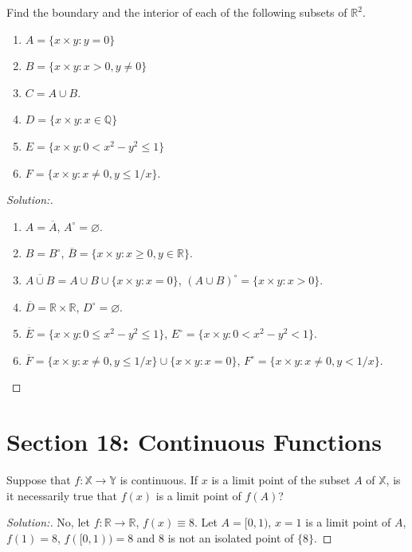 \documentclass[a4paper,12pt, reqno]{article}
\theoremstyle{definition}
\newenvironment{exerr}[1]{
  \renewcommand\theexeralt{#1}
  \exeralt
}{\endexeralt}
\newenvironment{solution}{\begin{proof}[Solution:]}{\end{proof}}
\newcommand{\R}{\mathbb{R}}
\newcommand{\Q}{\mathbb{Q}}
\newcommand{\X}{\mathbb{X}}
\newcommand{\Y}{\mathbb{Y}}
\begin{document}
\begin{exerr}{20}
  Find the boundary and the interior of each of the following subsets of $\R^2$.
  \begin{enumerate}[label = (\alph*)]
    \item $A = \{ x\times y : y=0 \}$
    \item $B = \{ x\times y : x>0, y\neq 0 \}$
    \item $C = A\cup B$.
    \item $D = \{ x\times y : x\in \Q \}$
    \item $E = \{ x\times y : 0<x^2-y^2\leq 1 \}$
    \item $F = \{ x\times y : x\neq0, y\leq 1/x \}$.
  \end{enumerate}
\end{exerr}
\begin{solution}\hfill
  \begin{enumerate}[label = (\alph*)]
    \item $A = \overline{A}$, $A^\circ = \varnothing$.
    \item $B = B^\circ$, $\overline{B} = \{ x\times y : x\geq0, y\in\R \}$.
    \item $\overline{A\cup B} = A\cup B\cup \{ x\times y : x=0 \}$, $(A\cup B)^\circ = \{ x\times y : x>0 \}$.
    \item $\overline{D} = \R\times\R$, $D^\circ = \varnothing$.
    \item $\overline{E} = \{ x\times y : 0\leq x^2-y^2\leq1 \}$, $E^\circ = \{ x\times y : 0<x^2-y^2<1 \}$.
    \item $\overline{F} = \{ x\times y : x\neq0, y\leq 1/x \}\cup\{ x\times y : x=0 \}$, $F^\circ = \{ x\times y : x\neq0, y<1/x \}$.
  \end{enumerate}
\end{solution}

\section*{Section 18: Continuous Functions}

\begin{exerr}{2}
  Suppose that $f:\X\to\Y$ is continuous. If $x$ is a limit point of the subset $A$ of $\X$, is it necessarily true that $f(x)$ is a limit point of $f(A)$?
\end{exerr}
\begin{solution}
  No, let $f:\R\to\R$, $f(x)\equiv 8$. Let $A = [0,1)$, $x=1$ is a limit point of $A$, $f(1) =8$, $f([0,1))=8$ and $8$ is not an isolated point of $\{ 8 \}$.
\end{solution}
\end{document}

